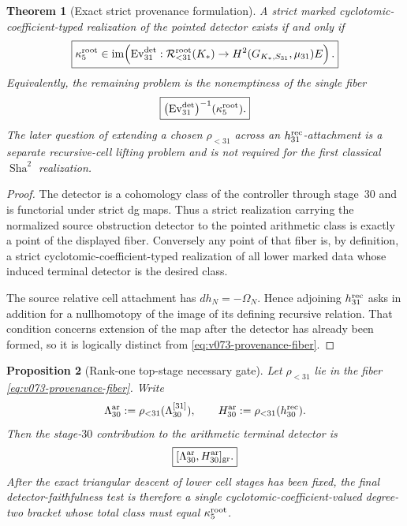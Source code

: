 \documentclass[11pt]{article}
\newtheorem{theorem}{Theorem}[section]
\newtheorem{proposition}[theorem]{Proposition}
\theoremstyle{remark}
\providecommand{\Sha}{\operatorname{Sha}}
\begin{document}
\begin{theorem}[Exact strict provenance formulation]
\label{thm:v073-exact-provenance-gate}
A strict marked cyclotomic-coefficient-typed realization of the pointed detector exists if and
only if
\begin{equation}
 \boxed{
 \kappa_5^{\rm root}
 \in
 \operatorname{im}\!\left(
 \operatorname{Ev}_{31}^{\det}:
 \mathcal R_{<31}^{\rm root}(K_*)
 \to H^2(G_{K_*,S_{31}},\mu_{31})E
 \right).}
 \label{eq:v073-provenance-fiber}
\end{equation}
Equivalently, the remaining problem is the nonemptiness of the single fiber
\[
 \boxed{
 \bigl(\operatorname{Ev}_{31}^{\det}\bigr)^{-1}
 (\kappa_5^{\rm root}).}
\]
The later question of extending a chosen \(\rho_{<31}\) across an
\(h_{31}^{\rm rec}\)-attachment is a separate recursive-cell lifting
problem and is not required for the first classical \(\Sha^2\) realization.
\end{theorem}

\begin{proof}
The detector is a cohomology class of the controller through stage~30 and
is functorial under strict dg maps.  Thus a strict realization carrying the
normalized source obstruction detector to the pointed arithmetic class is exactly a
point of the displayed fiber.  Conversely any point of that fiber is, by
definition, a strict cyclotomic-coefficient-typed realization of all lower marked data whose
induced terminal detector is the desired class.

The source relative cell attachment has
\(dh_N=-\Omega_N\).  Hence adjoining \(h_{31}^{\rm rec}\) asks in addition
for a nullhomotopy of the image of its defining recursive relation.  That
condition concerns extension of the map after the detector has already been
formed, so it is logically distinct from
\eqref{eq:v073-provenance-fiber}.
\end{proof}

\begin{proposition}[Rank-one top-stage necessary gate]
\label{prop:v073-top-bracket-gate}
Let \(\rho_{<31}\) lie in the fiber
\eqref{eq:v073-provenance-fiber}.  Write
\[
 \Lambda_{30}^{\rm ar}
 :=\rho_{<31}(\Lambda_{30}^{[31]}),
 \qquad
 H_{30}^{\rm ar}:=\rho_{<31}(h_{30}^{\rm rec}).
\]
Then the stage-\(30\) contribution to the arithmetic terminal detector is
\begin{equation}
 \boxed{
 [\Lambda_{30}^{\rm ar},H_{30}^{\rm ar}]_{\rm gr}.}
 \label{eq:v073-arithmetic-top-bracket}
\end{equation}
After the exact triangular descent of lower cell stages has been fixed, the
final detector-faithfulness test is therefore a single cyclotomic-coefficient-valued
degree-two bracket whose total class must equal
\(\kappa_5^{\rm root}\).
\end{proposition}
\end{document}
